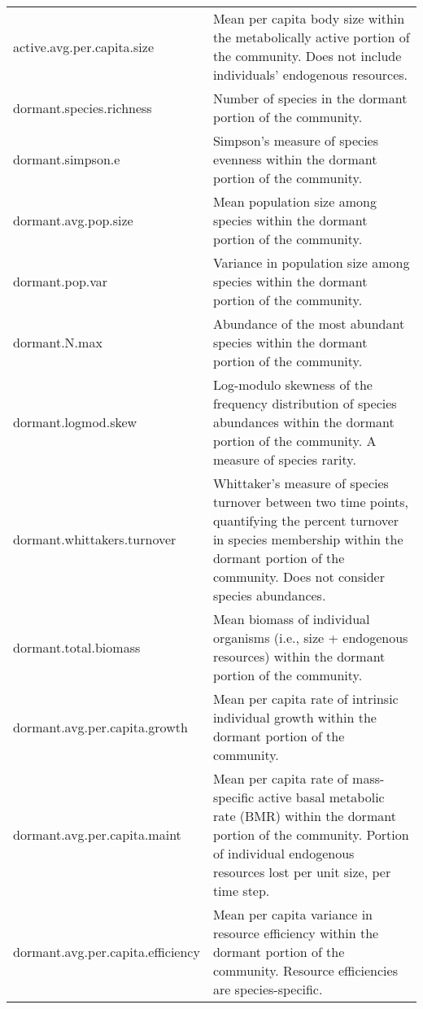 \documentclass[12pt]{article}
\begin{document}
\begin{longtable}{| p{} | p{} |}
active.avg.per.capita.size & Mean per capita body size within the metabolically active portion of the community. Does not include individuals' endogenous resources. \\[6pt]

dormant.species.richness & Number of species in the dormant portion of the community. \\[6pt]

dormant.simpson.e & Simpson's measure of species evenness within the dormant portion of the community. \\[6pt]

dormant.avg.pop.size & Mean population size among species within the dormant portion of the community.  \\[6pt]

dormant.pop.var & Variance in population size among species within the dormant portion of the community. \\[6pt]

dormant.N.max & Abundance of the most abundant species within the dormant portion of the community. \\[6pt]

dormant.logmod.skew & Log-modulo skewness of the frequency distribution of species abundances within the dormant portion of the community. A measure of species rarity. \\[6pt]

dormant.whittakers.turnover & Whittaker's measure of species turnover between two time points, quantifying the percent turnover in species membership within the dormant portion of the community. Does not consider species abundances. \\[6pt]

dormant.total.biomass & Mean biomass of individual organisms (i.e., size + endogenous resources) within the dormant portion of the community. \\[6pt]

dormant.avg.per.capita.growth & Mean per capita rate of intrinsic individual growth within the dormant portion of the community. \\[6pt]

dormant.avg.per.capita.maint & Mean per capita rate of mass-specific active basal metabolic rate (BMR) within the dormant portion of the community. Portion of individual endogenous resources lost per unit size, per time step. \\[6pt]

dormant.avg.per.capita.efficiency & Mean per capita variance in resource efficiency within the dormant portion of the community. Resource efficiencies are species-specific. \\[6pt]


\end{longtable}
\end{document}
